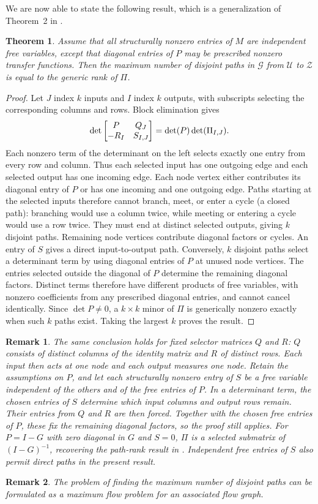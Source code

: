 \documentclass[journal,twoside,web]{ieeecolor}
\newtheorem{theorem}{Theorem}
\newtheorem{remark}{Remark}
\begin{document}
We are now able to state the following result, which is a generalization of
Theorem~2 in \cite{wou91}.
%
\begin{theorem}
%
Assume that all structurally nonzero entries of $M$ are independent free
variables, except that diagonal entries of $P$ may be prescribed nonzero
transfer functions. Then the maximum number of disjoint paths
in $\mathcal G$ from $\mathcal U$ to $\mathcal Z$ is equal to the generic rank of $\Pi$.
%
\end{theorem}
%
\begin{proof}
Let $J$ index $k$ inputs and $I$ index $k$ outputs, with subscripts selecting
the corresponding columns and rows. Block elimination gives
%
$$\det\begin{bmatrix} P&Q_J\\-R_I&S_{I,J}\end{bmatrix}
=\det(P)\det(\Pi_{I,J}).$$
%
Each nonzero term of the determinant on the left selects exactly one entry
from every row and column. Thus each selected input has one outgoing edge
and each selected output has one incoming edge. Each node vertex either
contributes its diagonal entry of $P$ or has one incoming and one outgoing
edge. Paths starting at the selected inputs therefore cannot branch, meet,
or enter a cycle (a closed path): branching would use a column twice, while meeting or
entering a cycle would use a row twice. They must end at distinct selected
outputs, giving $k$ disjoint paths. Remaining node vertices contribute
diagonal factors or cycles. An entry of $S$ gives a direct
input-to-output path.
Conversely, $k$ disjoint paths select a determinant term by using diagonal
entries of $P$ at unused node vertices. The entries selected outside the
diagonal of $P$ determine the remaining diagonal factors. Distinct terms
therefore have different products of free variables, with nonzero
coefficients from any prescribed diagonal entries, and cannot cancel identically.
Since $\det P\ne0$, a $k\times k$ minor of $\Pi$ is generically nonzero
exactly when such $k$ paths exist. Taking the largest $k$ proves the result.
\end{proof}
%
\begin{remark}
The same conclusion holds for fixed {\it selector matrices} $Q$ and $R$:
$Q$ consists of distinct columns of the identity matrix and $R$ of distinct
rows. Each input then acts at one node and each output measures one node.
Retain the assumptions on $P$, and let each structurally nonzero entry of
$S$ be a free variable independent of the others and of the free entries
of $P$. In a determinant term, the chosen entries of $S$ determine which
input columns and output rows remain. Their entries from $Q$ and $R$ are
then forced. Together with the chosen free entries of $P$, these fix the
remaining diagonal factors, so the proof still applies.
For $P=I-G$ with zero diagonal in $G$ and $S=0$, $\Pi$ is a selected
submatrix of $(I-G)^{-1}$, recovering the path-rank result in
\cite{hen+gev+baz19}. Independent free entries of $S$ also permit direct
paths in the present result.
\end{remark}
%
\begin{remark}
The problem of finding the
maximum number of disjoint paths can be formulated as a maximum flow
problem for an associated flow graph.
\end{remark}
%
\end{document}
